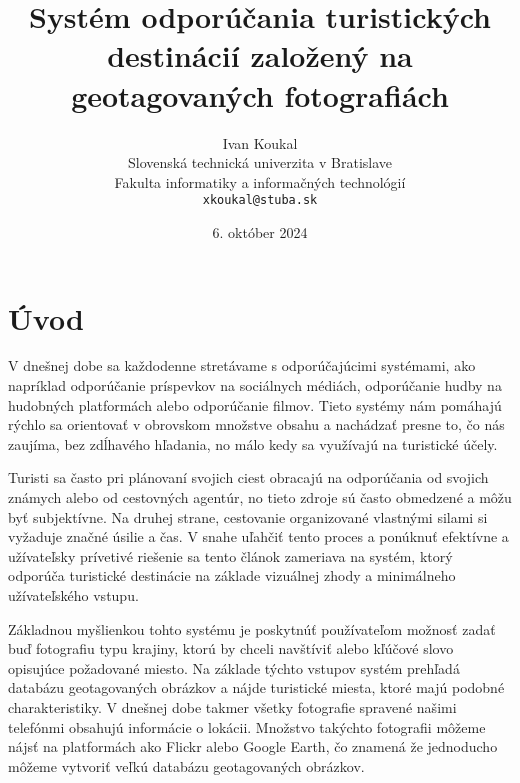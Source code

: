 \documentclass[10pt,twoside,slovak,a4paper]{article}
\title{Systém odporúčania turistických destinácií založený na geotagovaných fotografiách} %
\author{Ivan Koukal\\[2pt]
	{\small Slovenská technická univerzita v Bratislave}\\
	{\small Fakulta informatiky a informačných technológií}\\
	{\small \texttt{xkoukal@stuba.sk}}
	}
\date{\small 6. október 2024}
\begin{document}
\maketitle

\section{Úvod}

V dnešnej dobe sa každodenne stretávame s odporúčajúcimi systémami, ako napríklad odporúčanie príspevkov na sociálnych médiách, odporúčanie hudby na hudobných platformách alebo odporúčanie filmov. Tieto systémy nám pomáhajú rýchlo sa orientovať v obrovskom množstve obsahu a nachádzať presne to, čo nás zaujíma, bez zdĺhavého hľadania, no málo kedy sa využívajú na turistické účely.


Turisti sa často pri plánovaní svojich ciest obracajú na odporúčania od svojich známych alebo od cestovných agentúr, no tieto zdroje sú často obmedzené a môžu byť subjektívne. Na druhej strane, cestovanie organizované vlastnými silami si vyžaduje značné úsilie a čas. V snahe uľahčiť tento proces a ponúknuť efektívne a užívateľsky prívetivé riešenie sa tento článok zameriava na systém, ktorý odporúča turistické destinácie na základe vizuálnej zhody a minimálneho užívateľského vstupu.


Základnou myšlienkou tohto systému je poskytnúť používateľom možnosť zadať buď fotografiu typu krajiny, ktorú by chceli navštíviť alebo kľúčové slovo opisujúce požadované miesto. Na základe týchto vstupov systém prehľadá databázu geotagovaných obrázkov a nájde turistické miesta, ktoré majú podobné charakteristiky. V dnešnej dobe takmer všetky fotografie spravené našimi telefónmi obsahujú informácie o lokácii. Množstvo takýchto fotografii môžeme nájsť na platformách ako Flickr alebo Google Earth,  čo znamená že jednoducho môžeme vytvoriť veľkú databázu geotagovaných obrázkov. 




\nocite{5495905}
\end{document}

